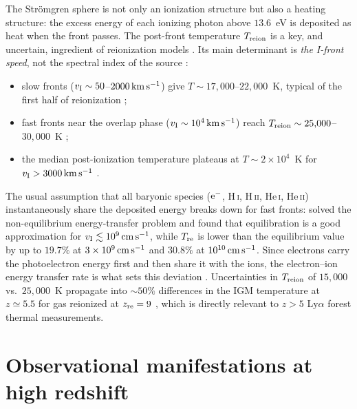 \documentclass[11pt,a4paper]{article}
\newcommand{\ion}[2]{\textrm{#1\,\textsc{#2}}}
\begin{document}
The Str\"omgren sphere is not only an ionization structure but also a heating structure: the excess
energy of each ionizing photon above $13.6$~eV is deposited as heat when the front passes. The
post-front temperature $T_{\rm reion}$ is a key, and uncertain, ingredient of reionization models
\citep{DAloisio2018}. Its main determinant is \emph{the I-front speed}, not the spectral index of the
source \citep{DAloisio2018,Zhu2025}:
\begin{itemize}
  \item slow fronts ($v_{\rm I}\sim50$--$2000\,{\rm km\,s^{-1}}$) give
        $T\sim17{,}000$--$22{,}000$~K, typical of the first half of reionization
        \citep{DAloisio2018,Zhu2025};
  \item fast fronts near the overlap phase ($v_{\rm I}\sim10^4\,{\rm km\,s^{-1}}$) reach
        $T_{\rm reion}\sim25{,}000$--$30{,}000$~K \citep{DAloisio2018,Zhu2025};
  \item the median post-ionization temperature plateaus at $T\sim2\times10^4$~K for
        $v_{\rm I}>3000\,{\rm km\,s^{-1}}$ \citep{Zhu2025}.
\end{itemize}
The usual assumption that all baryonic species (${\rm e^-}$, \ion{H}{i}, \ion{H}{ii}, \ion{He}{i},
\ion{He}{ii}) instantaneously share the deposited energy breaks down for fast fronts:
\citet{Zeng2020} solved the non-equilibrium energy-transfer problem and found that equilibration is a
good approximation for $v_{\rm I}\lesssim10^9\,{\rm cm\,s^{-1}}$, while $T_{\rm re}$ is lower than
the equilibrium value by up to $19.7\%$ at $3\times10^9\,{\rm cm\,s^{-1}}$ and $30.8\%$ at
$10^{10}\,{\rm cm\,s^{-1}}$. Since electrons carry the photoelectron energy first and then share it
with the ions, the electron--ion energy transfer rate is what sets this deviation \citep{Zeng2020}.
Uncertainties in $T_{\rm reion}$ of $15{,}000$ vs.\ $25{,}000$~K propagate into $\sim50\%$
differences in the IGM temperature at $z\simeq5.5$ for gas reionized at $z_{\rm re}=9$
\citep{DAloisio2018}, which is directly relevant to $z>5$ Ly$\alpha$ forest thermal measurements.

\section{Observational manifestations at high redshift}
\label{sec:obs}
\end{document}
